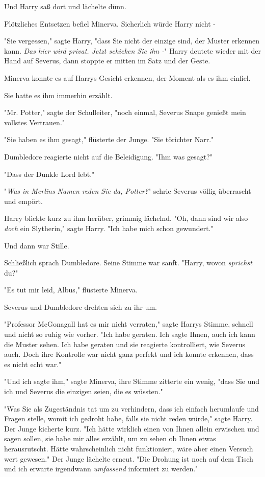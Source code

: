 {Und Harry saß dort und lächelte dünn.

Plötzliches Entsetzen befiel Minerva. Sicherlich würde Harry nicht -

"Sie vergessen," sagte Harry, "dass Sie nicht der einzige sind, der Muster erkennen kann. \emph{Das hier wird privat. Jetzt schicken Sie ihn -}" Harry deutete wieder mit der Hand auf Severus, dann stoppte er mitten im Satz und der Geste.

Minerva konnte es auf Harrys Gesicht erkennen, der Moment als es ihm einfiel.

Sie hatte es ihm immerhin erzählt.

"Mr. Potter," sagte der Schulleiter, "noch einmal, Severus Snape genießt mein vollstes Vertrauen."

"Sie haben es ihm gesagt," flüsterte der Junge. "Sie törichter Narr."

Dumbledore reagierte nicht auf die Beleidigung. "Ihm was gesagt?"

"Dass der Dunkle Lord lebt."

"\emph{Was in Merlins Namen reden Sie da, Potter?}" schrie Severus völlig überrascht und empört.

Harry blickte kurz zu ihm herüber, grimmig lächelnd. "Oh, dann sind wir also \emph{doch} ein Slytherin," sagte Harry. "Ich habe mich schon gewundert."

Und dann war Stille.

Schließlich sprach Dumbledore. Seine Stimme war sanft. "Harry, wovon \emph{sprichst} du?"

"Es tut mir leid, Albus," flüsterte Minerva.

Severus und Dumbledore drehten sich zu ihr um.

"Professor McGonagall hat es mir nicht verraten," sagte Harrys Stimme, schnell und nicht so ruhig wie vorher. "Ich habe geraten. Ich sagte Ihnen, auch ich kann die Muster sehen. Ich habe geraten und sie reagierte kontrolliert, wie Severus auch. Doch ihre Kontrolle war nicht ganz perfekt und ich konnte erkennen, dass es nicht echt war."

"Und ich sagte ihm," sagte Minerva, ihre Stimme zitterte ein wenig, "dass Sie und ich und Severus die einzigen seien, die es wüssten."

"Was Sie als Zugeständnis tat um zu verhindern, dass ich einfach herumlaufe und Fragen stelle, womit ich gedroht habe, falls sie nicht reden würde," sagte Harry. Der Junge kicherte kurz. "Ich hätte wirklich einen von Ihnen allein erwischen und sagen sollen, sie habe mir alles erzählt, um zu sehen ob Ihnen etwas herausrutscht. Hätte wahrscheinlich nicht funktioniert, wäre aber einen Versuch wert gewesen." Der Junge lächelte erneut. "Die Drohung ist noch auf dem Tisch und ich erwarte irgendwann \emph{umfassend} informiert zu werden."

}
